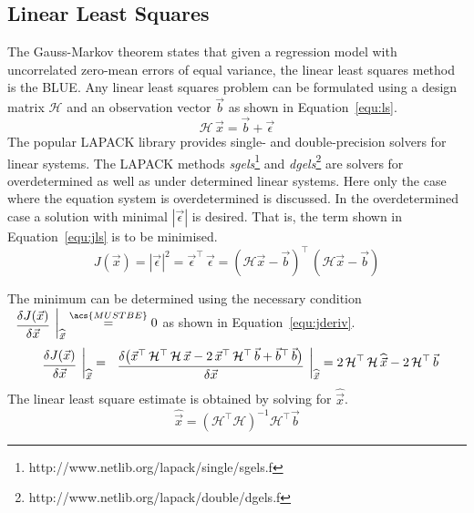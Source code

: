 \documentclass[12pt,a4paper,oneside,openright]{book}
\newcommand{\Ie}{That is, }
\newcommand{\equ}[1]{Equation~\ref{equ:#1}}
\begin{document}
\begin{CJK}{UTF8}{}
\section{Linear Least Squares}\label{cha:lse}
The Gauss-Markov theorem states that given a regression model with uncorrelated zero-mean errors of equal variance, the linear least squares method is the \acl{BLUE}. Any linear least squares problem can be formulated using a design matrix $\mathcal{H}$ and an observation vector $\vec{b}$ as shown in \equ{ls}.
\begin{equation}\label{equ:ls}
  \mathcal{H}\,\vec{x}=\vec{b}+\vec{\epsilon}
\end{equation}
The popular LAPACK library provides single- and double-precision solvers for linear systems. The LAPACK methods \emph{sgels}\footnote{http://www.netlib.org/lapack/single/sgels.f} and \emph{dgels}\footnote{http://www.netlib.org/lapack/double/dgels.f} are solvers for overdetermined as well as under determined linear systems. Here only the case where the equation system is overdetermined is discussed. In the overdetermined case a solution with minimal $\left|\vec{\epsilon}\right|$ is desired. \Ie the term shown in \equ{jls} is to be minimised.
\begin{equation}\label{equ:jls}
  J(\vec{x})=\left|\vec{\epsilon}\right|^2=\vec{\epsilon}^\top\,\vec{\epsilon}=(\mathcal{H}\vec{x}-\vec{b})^\top\,(\mathcal{H}\vec{x}-\vec{b})
\end{equation}

The minimum can be determined using the necessary condition $\left.\begin{array}{c}\cfrac{\delta J(\vec{x})}{\delta\vec{x}}\end{array}\right|_{\widehat{\vec{x}}}\overset{\acs{MUSTBE}}{=}0$ as shown in \equ{jderiv}.
\begin{equation}\label{equ:jderiv}
  \left.\begin{array}{c}\cfrac{\delta J(\vec{x})}{\delta\vec{x}}\end{array}\right|_{\widehat{\vec{x}}}=\left.\begin{array}{c}\cfrac{\delta\big(\vec{x}^\top\,\mathcal{H}^\top\,\mathcal{H}\,\vec{x}-2\,\vec{x}^\top\,\mathcal{H}^\top\,\vec{b}+\vec{b}^\top\,\vec{b}\big)}{\delta\vec{x}}\end{array}\right|_{\widehat{\vec{x}}}=2\,\mathcal{H}^\top\,\mathcal{H}\,\widehat{\vec{x}}-2\,\mathcal{H}^\top\,\vec{b}
\end{equation}
The linear least square estimate is obtained by solving for $\widehat{\vec{x}}$.
\begin{equation}\label{equ:lseres}
  \widehat{\vec{x}}=(\mathcal{H}^\top\mathcal{H})^{-1}\mathcal{H}^\top\vec{b}
\end{equation}


\end{CJK}
\end{document}

